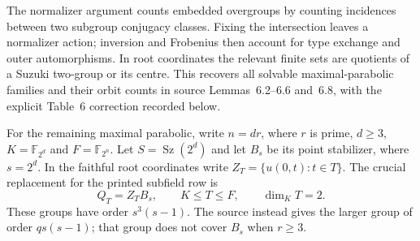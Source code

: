 \documentclass[11pt]{article}
\newcommand{\Sz}{\operatorname{Sz}}
\newcommand{\F}{\mathbb F}
\begin{document}
The normalizer argument counts embedded overgroups by counting incidences
between two subgroup conjugacy classes. Fixing the intersection leaves
a normalizer action; inversion and Frobenius then account for type
exchange and outer automorphisms. In root coordinates the relevant
finite sets are quotients of a Suzuki two-group or its centre. This
recovers all solvable maximal-parabolic families and their orbit counts
in source Lemmas~6.2--6.6 and~6.8, with the explicit Table~6 correction
recorded below.

For the remaining maximal parabolic, write $n=dr$, where $r$ is prime,
$d\ge3$, $K=\F_{2^d}$ and $F=\F_{2^n}$. Let $S=\Sz(2^d)$ and let
$B_s$ be its point stabilizer, where $s=2^d$. In the faithful root
coordinates write $Z_T=\{u(0,t):t\in T\}$. The crucial replacement for
the printed subfield row is
\[
 Q_T=Z_TB_s,\qquad K\le T\le F,\qquad\dim_KT=2.       \tag{1}
\]
These groups have order $s^3(s-1)$. The source instead gives the larger
group of order $qs(s-1)$; that group does not cover $B_s$ when $r\ge3$.
\end{document}
